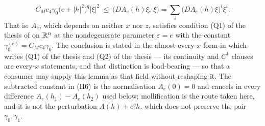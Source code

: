 \begin{helper}
\[
C_Mc_4\gamma_0\bigl(e+|h|^2\bigr)^{q}|\xi|^2
\ \le\ \bigl(DA_e(h)\xi,\,\xi\bigr)
=\sum_i\bigl(DA_e(h)\xi\bigr)^i\xi^i .
\]
That is: $A_e$, which depends on neither $x$ nor $z$, satisfies condition
(Q1) of the thesis of  on $\mathbb{R}^n$ at the nondegenerate
parameter $\varepsilon=e$ with the constant $\gamma_0^{(e)}=C_Mc_4\gamma_0$.
The conclusion is stated in the almost-every-$x$ form in which
 writes (Q1) of the thesis and (Q2) of the thesis --- its
continuity and $C^1$ clauses are every-$x$ statements, and that distinction is
load-bearing --- so that a consumer may supply this lemma as that field without
reshaping it.  The subtracted constant in (H6) is the normalisation
$A_e(0)=0$ and cancels in every difference $A_e(h_1)-A_e(h_2)$ used below;
mollification is the route taken here, and it is not the perturbation
$A(h)+e^{q}h$, which does not preserve the pair $\gamma_0,\gamma_1$.
\end{helper}

